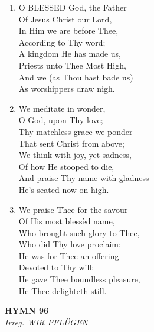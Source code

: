 \begin{enumerate}
    \item O BLESSED God, the Father \\
        Of Jesus Christ our Lord, \\
        In Him we are before Thee, \\
        According to Thy word; \\
        A kingdom He has made us, \\
        Priests unto Thee Most High, \\
        And we (as Thou hast bade us) \\
        As worshippers draw nigh.

    \item We meditate in wonder, \\
        O God, upon Thy love; \\
        Thy matchless grace we ponder \\
        That sent Christ from above; \\
        We think with joy, yet sadness, \\
        Of how He stooped to die, \\
        And praise Thy name with gladness \\
        He's seated now on high.

    \item We praise Thee for the savour \\
        Of His most bless\`ed name, \\
        Who brought such glory to Thee, \\
        Who did Thy love proclaim; \\
        He was for Thee an offering \\
        Devoted to Thy will; \\
        He gave Thee boundless pleasure, \\
        He Thee delighteth still.

\end{enumerate}

\newpage
\begin{center}
    {\Large \textbf{HYMN 96\textdagger{}}}
    \\
    \textit{Irreg. WIR PFL\"{U}GEN}
\end{center}
\vspace{1em}


